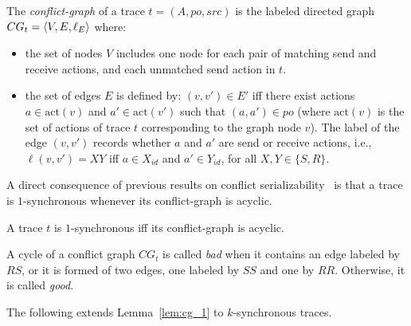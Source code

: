 
\begin{definition}\label{def:conf_graph}
    The \emph{conflict-graph} of a trace $t=(A,po,src)$ is the labeled directed graph $CG_t=\left\langle {V,E,\ell_E} \right\rangle$ where:
\begin{itemize}
	\item the set of nodes $V$ includes one node for each pair of matching send and receive actions, and each unmatched send action in $t$. 
    	\item the set of edges $E$ is defined by: $(v,v') \in E'$ iff there exist actions $a \in \mathrm{act}(v)$ and $a' \in \mathrm{act}(v')$ such that $(a,a') \in po$ (where $\mathrm{act}(v)$ is the set of actions of trace $t$ corresponding to the graph node $v$). The label of the edge $(v,v')$ records whether $a$ and $a'$ are send or receive actions, i.e., $\ell(v,v')=XY$ iff $a\in X_{id}$ and $a'\in Y_{id}$, for all $X,Y\in \{S,R\}$.
\end{itemize}
\end{definition}

A direct consequence of previous results on conflict serializability~\cite{} is that 
a trace is $1$-synchronous whenever its conflict-graph is acyclic.

\begin{lemma}\label{lem:cg_1}
A trace $t$ is $1$-synchronous if{f} its conflict-graph is acyclic.
\end{lemma}

A cycle of a conflict graph $CG_t$ is called \emph{bad} when it contains %
an edge labeled by $RS$, or it is formed of two edges, one labeled by $SS$ and one by $RR$. Otherwise, it is called \emph{good}.

The following extends Lemma~\ref{lem:cg_1} to $k$-synchronous traces.

